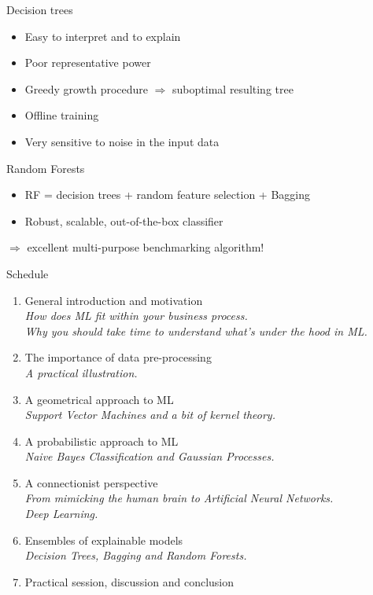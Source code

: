 \documentclass{beamer}
\begin{document}
\begin{frame}{Decision trees}
\begin{itemize}
\item Easy to interpret and to explain
\item Poor representative power
\item Greedy growth procedure $\Rightarrow$ suboptimal resulting tree
\item Offline training
\item Very sensitive to noise in the input data
\end{itemize}
\end{frame}

\begin{frame}{Random Forests}
\begin{itemize}
\item RF = decision trees + random feature selection + Bagging
\item Robust, scalable, out-of-the-box classifier
\end{itemize}
$\Rightarrow$ excellent multi-purpose benchmarking algorithm!
\end{frame}

\begin{frame}{Schedule}
\begin{enumerate}
\item General introduction and motivation \Checkmark \\
{\small \it How does ML fit within your business process.\\
Why you should take time to understand what's under the hood in ML.}
\item The importance of data pre-processing \Checkmark \\
{\small \it A practical illustration.}
\item A geometrical approach to ML \Checkmark \\
{\small \it Support Vector Machines and a bit of kernel theory.}
\item A probabilistic approach to ML \Checkmark \\
{\small \it Naive Bayes Classification and Gaussian Processes.}
\item A connectionist perspective \Checkmark \\
{\small \it From mimicking the human brain to Artificial Neural Networks.\\
Deep Learning.}
\item Ensembles of explainable models \Checkmark \\
{\small \it Decision Trees, Bagging and Random Forests.}
\item Practical session, discussion and conclusion
\end{enumerate}
\end{frame}
\end{document}
